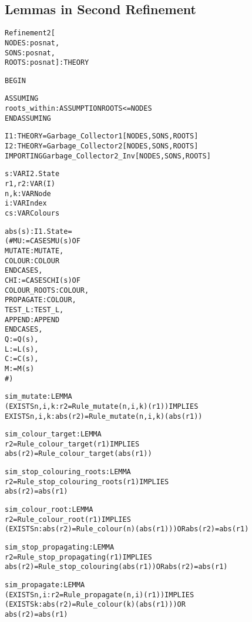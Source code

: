 
\newpage
\subsection{Lemmas in Second Refinement}

\begin{alltt}
%%%%%%%%%%%%%%%%%%%%%%%%%%%%%%%%%%%%%%%%%%%%%%%%
% Refinement2 :                                %
%   Applies the ``Refinement'' theory to yield %
%   the second refinement lemma ``R2''.        %
%%%%%%%%%%%%%%%%%%%%%%%%%%%%%%%%%%%%%%%%%%%%%%%%

Refinement2[
  NODES : posnat, 
  SONS  : posnat, 
  ROOTS : posnat] : THEORY

BEGIN

  ASSUMING
    roots_within : ASSUMPTION ROOTS <= NODES
  ENDASSUMING

  I1 : THEORY = Garbage_Collector1[NODES,SONS,ROOTS]
  I2 : THEORY = Garbage_Collector2[NODES,SONS,ROOTS]
  IMPORTING Garbage_Collector2_Inv[NODES,SONS,ROOTS]

  s     : VAR I2.State
  r1,r2 : VAR (I)
  n,k   : VAR Node
  i     : VAR Index
  cs    : VAR Colours

  abs(s):I1.State = 
    (# MU := CASES MU(s) OF
               MUTATE : MUTATE,
               COLOUR : COLOUR
             ENDCASES,
       CHI := CASES CHI(s) OF
                COLOUR_ROOTS : COLOUR,
                   PROPAGATE : COLOUR,
                      TEST_L : TEST_L,
                      APPEND : APPEND
              ENDCASES,
       Q   := Q(s),
       L   := L(s),
       C   := C(s),
       M   := M(s)
     #)

  sim_mutate : LEMMA
    (EXISTS n,i,k: r2 = Rule_mutate(n,i,k)(r1)) IMPLIES
      EXISTS n,i,k: abs(r2) = Rule_mutate(n,i,k)(abs(r1))

  sim_colour_target : LEMMA
    r2 = Rule_colour_target(r1) IMPLIES
      abs(r2) = Rule_colour_target(abs(r1))

  sim_stop_colouring_roots : LEMMA
    r2 = Rule_stop_colouring_roots(r1) IMPLIES
      abs(r2) = abs(r1)

  sim_colour_root : LEMMA
    r2 = Rule_colour_root(r1) IMPLIES
      (EXISTS n: abs(r2) = Rule_colour(n)(abs(r1))) OR abs(r2) = abs(r1)

  sim_stop_propagating : LEMMA
    r2 = Rule_stop_propagating(r1) IMPLIES
      abs(r2) = Rule_stop_colouring(abs(r1)) OR abs(r2) = abs(r1)

  sim_propagate : LEMMA
    (EXISTS n,i: r2 = Rule_propagate(n,i)(r1)) IMPLIES
      (EXISTS k: abs(r2) = Rule_colour(k)(abs(r1))) OR
      abs(r2) = abs(r1)


\end{alltt}
